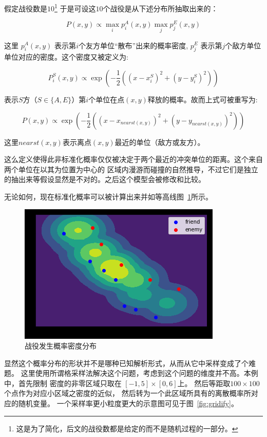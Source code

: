 \documentclass{sicnuthesis}
\begin{document}
假定战役数是$10$\footnote{这是为了简化，后文的战役数都是给定的而不是随机过程的一部分。}
于是可设这$10$个战役是从下述分布所抽取出来的：

$$
P(x,y) \propto \max_i p^A_{i}(x,y) \max_j p^E_{j} (x,y)
$$


这里 $p^A_{i}(x,y)$ 表示第$i$个友方单位“散布”出来的概率密度,
$p^E_{j}$ 表示第$j$个敌方单位单位对应的密度。这个密度又被定义为:


$$
P^S_i(x,y) \propto \exp(-\frac{1}{2}((x-x^S_i)^2 + (y-y^S_i)^2))
$$


表示$S$方（$S \in \{A,E  \}$）第$i$个单位在点$(x,y)$释放的概率。故而上式可被重写为: 

$$
P(x,y) \propto \exp(-\frac{1}{2}((x-x_{nearst(x,y)})^2 + (y-y_{nearst(x,y)})^2))
$$

这里$nearst(x,y)$表示离点$(x,y)$最近的单位（敌方或友方）。

这么定义使得此非标准化概率仅仅被决定于两个最近的冲突单位的距离。这个来自两个单位在以其为位置为中心的
区域内漫游而碰撞的自然推导，不过它们是独立的抽出来等假设显然是不对的。之后这个模型会被修改和比较。

无论如何，现在标准化概率可以被计算出来并如等高线图~\ref{fig:stateNoBattleProb}所示。

\begin{figure}[htb]
\includegraphics{state_no_battle_prob.png}
\caption{战役发生概率密度分布}
\label{fig:stateNoBattleProb}
\end{figure}


显然这个概率分布的形状并不是哪种已知解析形式，从而从它中采样变成了个难题。 
这里使用所谓格采样法解决这个问题，考虑到这个问题的维度并不高。本例中，首先限制
密度的非零区域只取在 $[-1,5] \times [0,6]$上。
然后等距取$100 \times 100$个点作为对应小区域之密度的近似，
然后转为一个此区域所具有的离散概率所对应的随机变量。
一个采样率更小粒度更大的示意图可见于图~\ref{fig:gridify}。
\end{document}
